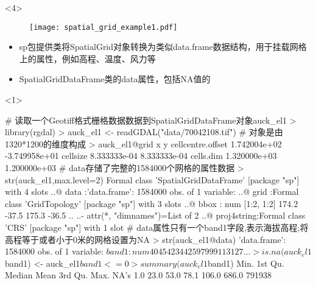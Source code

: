 \begin{frame}[t,fragile]{\subsecname}{\subsubsecname}
\begin{overlayarea}{\textwidth}{\textheight}
\begin{onlyenv}<4>
\begin{figure}[ht] \vspace{-10pt}
  \texttt{[image: spatial\_grid\_example1.pdf]}
\end{figure}
\end{onlyenv}
\end{overlayarea}
\end{frame}

\begin{frame}[t,fragile]{\subsecname}{\subsubsecname}
\begin{itemize}
\item<1-> sp包提供类将SpatialGrid对象转换为类似data.frame数据结构，用于挂载网格上的属性，例如高程、温度、风力等
\item<1-> SpatialGridDataFrame类的data属性，包括NA值的
\end{itemize}

\begin{overlayarea}{\textwidth}{\textheight}
\begin{onlyenv}<1>
\begin{rcode}
# 读取一个Geotiff格式栅格数据数据到SpatialGridDataFrame对象auck\_el1
> library(rgdal)
> auck_el1 <- readGDAL("data/70042108.tif")
# 对象是由1320*1200的维度构成
> auck_el1@grid
                             x             y
cellcentre.offset 1.742004e+02 -3.749958e+01
cellsize          8.333333e-04  8.333333e-04
cells.dim         1.320000e+03  1.200000e+03
# data存储了完整的1584000个网格的属性数据
> str(auck_el1,max.level=2)
Formal class 'SpatialGridDataFrame' [package "sp"] with 4 slots
  ..@ data       :'data.frame': 1584000 obs. of  1 variable:
  ..@ grid       :Formal class 'GridTopology' [package "sp"] with 3 slots
  ..@ bbox       : num [1:2, 1:2] 174.2 -37.5 175.3 -36.5
  .. ..- attr(*, "dimnames")=List of 2
  ..@ proj4string:Formal class 'CRS' [package "sp"] with 1 slot
# data属性只有一个band1字段,表示海拔高程;将高程等于或者小于0米的网格设置为NA
> str(auck_el1@data)
'data.frame':   1584000 obs. of  1 variable:
 $ band1: num  40 45 42 34 42 59 79 99 113 127 ... 
> is.na(auck_el1$band1) <- auck_el1$band1 <= 0
> summary(auck_el1$band1)
   Min. 1st Qu.  Median    Mean 3rd Qu.    Max.    NA's 
    1.0    23.0    53.0    78.1   106.0   686.0  791938 
\end{rcode}
\end{onlyenv}
\end{overlayarea}
\end{frame}

